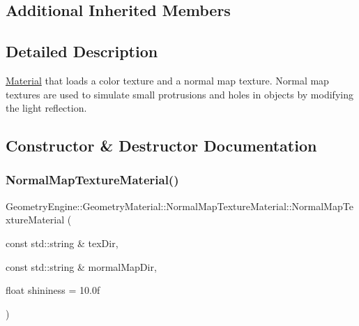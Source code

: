\subsection*{Additional Inherited Members}


\subsection{Detailed Description}
\mbox{\hyperlink{class_geometry_engine_1_1_geometry_material_1_1_material}{Material}} that loads a color texture and a normal map texture. Normal map textures are used to simulate small protrusions and holes in objects by modifying the light reflection. 

\subsection{Constructor \& Destructor Documentation}
\mbox{\label{class_geometry_engine_1_1_geometry_material_1_1_normal_map_texture_material_a40bc97d75e88354b1bbe58bb5d804a3d}} 
\subsubsection{\texorpdfstring{NormalMapTextureMaterial()}{NormalMapTextureMaterial()}\hspace{0.1cm}{\footnotesize\ttfamily [1/2]}}
{\footnotesize\ttfamily Geometry\+Engine\+::\+Geometry\+Material\+::\+Normal\+Map\+Texture\+Material\+::\+Normal\+Map\+Texture\+Material (\begin{DoxyParamCaption}\item[{const std\+::string \&}]{tex\+Dir,  }\item[{const std\+::string \&}]{mormal\+Map\+Dir,  }\item[{float}]{shininess = {\ttfamily 10.0f} }\end{DoxyParamCaption})}

